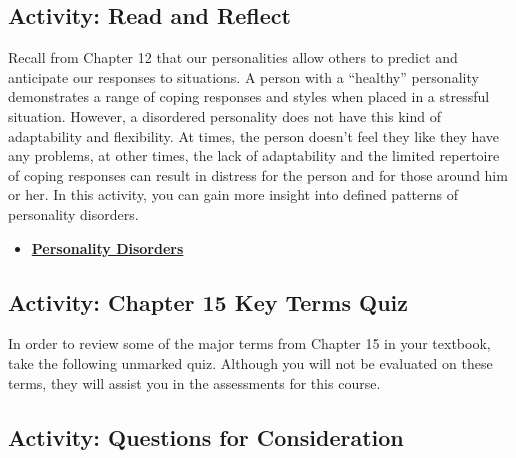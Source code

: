 \documentclass[
]{book}
\providecommand{\tightlist}{%
  \setlength{\itemsep}{0pt}\setlength{\parskip}{0pt}}
\begin{document}
\hypertarget{activity-read-and-reflect-19}{%
\subsection*{Activity: Read and Reflect}\label{activity-read-and-reflect-19}}

\begin{reflect}
Recall from Chapter 12 that our personalities allow others to predict and anticipate our responses to situations. A person with a ``healthy'' personality demonstrates a range of coping responses and styles when placed in a stressful situation. However, a disordered personality does not have this kind of adaptability and flexibility. At times, the person doesn't feel they like they have any problems, at other times, the lack of adaptability and the limited repertoire of coping responses can result in distress for the person and for those around him or her. In this activity, you can gain more insight into defined patterns of personality disorders.

\begin{itemize}
\tightlist
\item
  \href{https://www.camh.ca/en/health-info/mental-illness-and-addiction-index/personality-disorders}{\textbf{Personality Disorders}}
\end{itemize}
\end{reflect}

\hypertarget{activity-chapter-15-key-terms-quiz}{%
\subsection*{Activity: Chapter 15 Key Terms Quiz}\label{activity-chapter-15-key-terms-quiz}}

\begin{reflect}
In order to review some of the major terms from Chapter 15 in your textbook, take the following unmarked quiz. Although you will not be evaluated on these terms, they will assist you in the assessments for this course.
\end{reflect}

\hypertarget{activity-questions-for-consideration-17}{%
\subsection*{Activity: Questions for Consideration}\label{activity-questions-for-consideration-17}}
\end{document}
